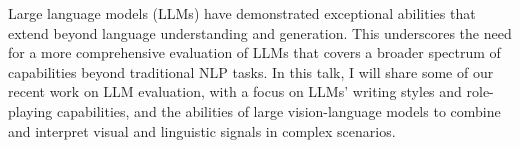 Large language models (LLMs) have demonstrated exceptional abilities that extend beyond language understanding and generation. This underscores the need for a more comprehensive evaluation of LLMs that covers a broader spectrum of capabilities beyond traditional NLP tasks. In this talk, I will share some of our recent work on LLM evaluation, with a focus on LLMs’ writing styles and role-playing capabilities, and the abilities of large vision-language models to combine and interpret visual and linguistic signals in complex scenarios.